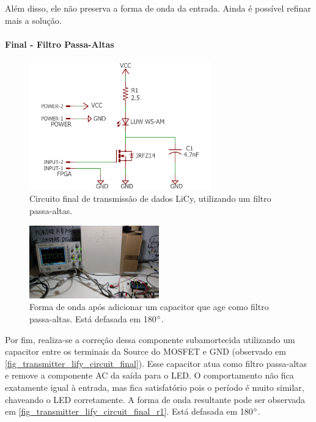 	Além disso, ele não preserva a forma de onda da entrada. Ainda é possível refinar mais a solução.
	
	\paragraph{Final - Filtro Passa-Altas}
			
	\begin{figure}[htb]
		\caption{\label{fig_transmitter_lify_circuit_final} Circuito final de transmissão de dados LiCy, utilizando um filtro passa-altas.}
		\centering		%
		\includegraphics[width=0.7\textwidth, trim={2cm 0cm 2cm 0cm}, clip]{circuits/transmitter_lify.pdf}
	\end{figure}
	
	\begin{figure}[htb]
		\caption{\label{fig_transmitter_lify_circuit_final_r1} Forma de onda após adicionar um capacitor que age como filtro passa-altas. Está defasada em 180$\degree$. }
		\centering		%
		\includegraphics[width=0.5\textwidth, trim={5cm 30cm 90cm 20cm}, clip]{circuits/photos/TX_200k_with_filter.jpeg}
	\end{figure}

	Por fim, realiza-se a correção dessa componente subamortecida utilizando um capacitor entre os terminais da Source do MOSFET e GND (observado em \autoref{fig_transmitter_lify_circuit_final}). Esse capacitor atua como filtro passa-altas e remove a componente AC da saída para o LED. O comportamento não fica exatamente igual à entrada, mas fica satisfatório pois o período é muito similar, chaveando o LED corretamente. A forma de onda resultante pode ser observada em \autoref{fig_transmitter_lify_circuit_final_r1}. Está defasada em 180$\degree$.

